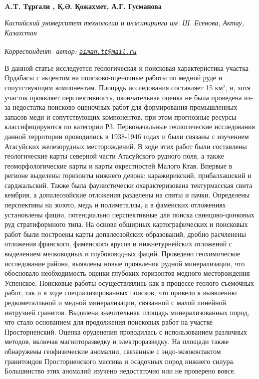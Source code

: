 
\begin{articleheader}

{\bfseries
A.T. Тұрғали\textsuperscript{\envelope } \authorid,
Қ.Ә. Қожахмет\authorid,
А.Г. Гусманова\authorid}
\end{articleheader}

\begin{affiliation}
\emph{Каспийский университет технологии и инжиниринга им. Ш. Есенова, Актау, Казахстан}

\raggedright \textsuperscript{\envelope }{\em Корреспондент- автор: \href{mailto:aiman.tt@mail.ru}{\nolinkurl{aiman.tt@mail.ru}}}
\end{affiliation}

В данной статье исследуется геологическая и поисковая характеристика
участка Ордабасы с акцентом на поисково-оценочные работы по медной руде
и сопутствующим компонентам. Площадь исследования составляет 15 км², и,
хотя участок проявляет перспективность, окончательная оценка не была
проведена из-за недостатка поисково-оценочных работ для формирования
промышленных запасов меди и сопутствующих компонентов, при этом
прогнозные ресурсы классифицируются по категории Р3. Первоначальные
геологические исследования данной территории проводились в 1938-1946
годах и были связаны с изучением Атасуйских железорудных месторождений.
В ходе этих работ были составлены геологические карты северной части
Атасуйского рудного поля, а также геоморфологические карты и карты
окрестностей Малого Ктая. Впервые в регионе выделены горизонты нижнего
девона: каражирикский, прибалхашский и сарджальский. Также была
фаунистически охарактеризована тектурмасская свита кембрия, а
допалеозойские отложения разделены на свиты и пачки. Определены
перспективы на золото, медь и полиметаллы, а в фаменских отложениях
установлены фации, потенциально перспективные для поиска
свинцово-цинковых руд стратиформного типа. На основе обширных
картографических и поисковых работ были построены карты допалеозойских
образований, дробно расчленены отложения франского, фаменского ярусов и
нижнетурнейских отложений с выделением мелководных и глубоководных
фаций. Проведено геохимическое исследование района, выявлены новые
проявления рудной минерализации, что обосновало необходимость оценки
глубоких горизонтов медного месторождения Успенское. Поисковые работы
осуществлялись как в процессе геолого-съемочных работ, так и в ходе
специализированных поисков, что привело к выявлению редкометалльной и
медной минерализации, связанной с малой линейной интрузией гранитов.
Выделена значительная площадь минерализованных пород, что стало
основанием для продолжения поисковых работ на участке Просторненский.
Оценка оруденения проводилась с использованием различных методов,
включая магниторазведку и электроразведку. На площади также обнаружены
геофизические аномалии, связанные с эндо-экзоконтактом гранитоидов
Просторненского массива и осадочных пород нижнего силура. Большинство
этих аномалий изучено недостаточно или не проверено вовсе.

